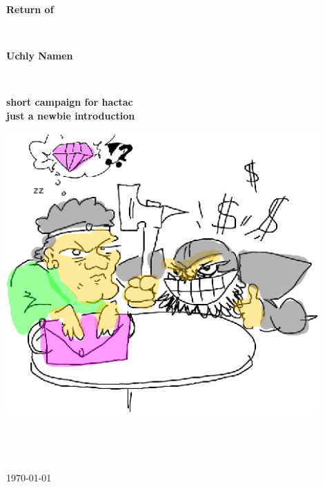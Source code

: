 \documentclass[11pt, twoside, titlepage, a4paper]{report}
\begin{document}

\begin{titlepage}

\begin{center}

   \vspace{4 cm} %

   \textbf{\Huge{Return of}}

   \ %

   \textbf{\Huge{Uchly Namen}}

   \ %

   \textbf{\Large{short campaign for hactac}} \\
   \textbf{\Large{just a newbie introduction}}


   \vspace{4 cm} %
   \includegraphics[width=120mm]{./figs/negotiate.eps}

   \vspace{4 cm} %



   \vfill %


   \ %



   \ %

   \normalsize{\today}

\end{center}


\end{titlepage}
\end{document}
